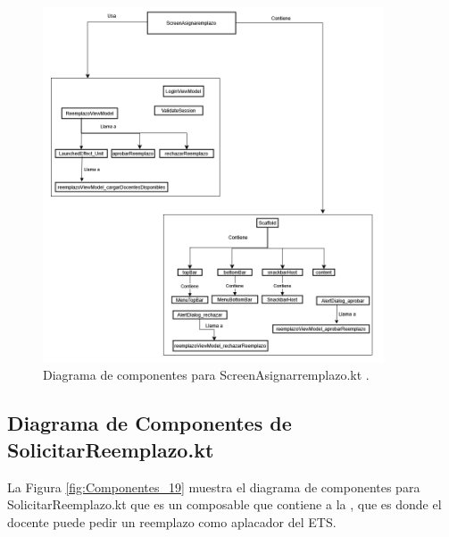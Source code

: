 \begin{figure}[htbp!]
	\begin{center}
		\includegraphics[width=0.9\textwidth]{DiagramasMoviles/DCM (31)}
		\caption{Diagrama de componentes para ScreenAsignarremplazo.kt .}
		\label{fig:Componentes_18}
	\end{center}
\end{figure}

\newpage

\subsection{Diagrama de Componentes de SolicitarReemplazo.kt}

La Figura \ref{fig:Componentes_19} muestra el diagrama de componentes para SolicitarReemplazo.kt que es un composable que contiene a la , que es donde el docente puede pedir un reemplazo como aplacador del ETS.

